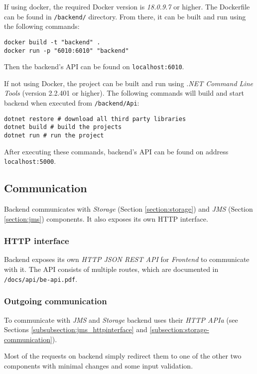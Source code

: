 If using docker, the required Docker version is \textit{18.0.9.7} or higher. The Dockerfile can be found in \texttt{/backend/} directory. From there, it can be built and run using the following commands:

\begin{lstlisting}
docker build -t "backend" .
docker run -p "6010:6010" "backend"
\end{lstlisting}
Then the backend's API can be found on \texttt{localhost:6010}.

If not using Docker, the project can be built and run using \textit{.NET Command Line Tools} (version 2.2.401 or higher). The following commands will build and start backend when executed from \texttt{/backend/Api}:

\begin{lstlisting}
dotnet restore # download all third party libraries
dotnet build # build the projects
dotnet run # run the project
\end{lstlisting}
After executing these commands, backend's API can be found on address\\ \texttt{localhost:5000}.


\subsection{Communication}\label{section:backend-communication}
Backend communicates with \textit{Storage} (Section \ref{section:storage}) and \textit{JMS} (Section \ref{section:jms}) components. It also exposes its own HTTP interface.

\subsubsection{HTTP interface}\label{section:backend-http-interface}
Backend exposes its own \textit{HTTP JSON REST API} for \textit{Frontend} to communicate with it. The API consists of multiple routes, which are documented in \texttt{/docs/api/be-api.pdf}.

\subsubsection{Outgoing communication}
To communicate with \textit{JMS} and \textit{Storage} backend uses their \textit{HTTP APIa} (see Sections \ref{subsubsection:jms_httpinterface} and \ref{subsection:storage-communication}).

Most of the requests on backend simply redirect them to one of the other two components with minimal changes and some input validation. 
